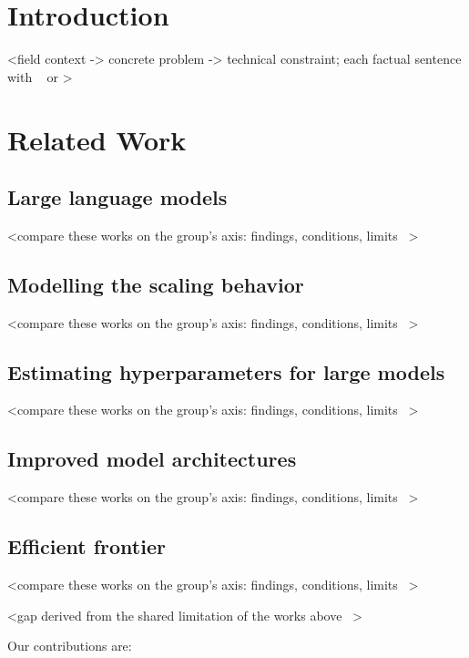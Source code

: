 \section{Introduction}

<field context -> concrete problem -> technical constraint; each factual sentence with ~\cite{key} or >

\section{Related Work}

\subsection{Large language models}

<compare these works on the group's axis: findings, conditions, limits ~\cite{k1,k2}>

\subsection{Modelling the scaling behavior}

<compare these works on the group's axis: findings, conditions, limits ~\cite{k1,k2}>

\subsection{Estimating hyperparameters for large models}

<compare these works on the group's axis: findings, conditions, limits ~\cite{k1,k2}>

\subsection{Improved model architectures}

<compare these works on the group's axis: findings, conditions, limits ~\cite{k1,k2}>

\subsection{Efficient frontier}

<compare these works on the group's axis: findings, conditions, limits ~\cite{k1,k2}>

<gap derived from the shared limitation of the works above ~\cite{k}>

Our contributions are:

